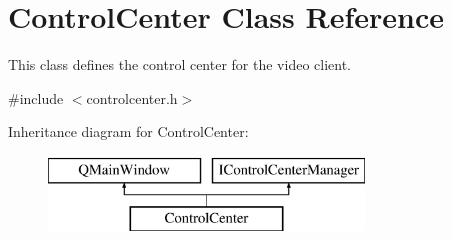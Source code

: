 \hypertarget{classControlCenter}{\section{Control\-Center Class Reference}
\label{classControlCenter}
}


This class defines the control center for the video client.  




{\ttfamily \#include $<$controlcenter.\-h$>$}

Inheritance diagram for Control\-Center\-:\begin{figure}[H]
\begin{center}
\leavevmode
\includegraphics[height=2.000000cm]{classControlCenter}
\end{center}
\end{figure}
